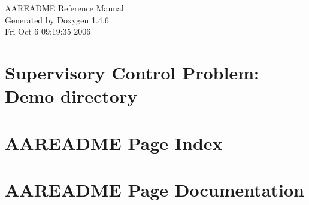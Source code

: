 \documentclass[a4paper]{book}
\begin{document}
\begin{titlepage}
\vspace*{7cm}
\begin{center}
{\Large AAREADME Reference Manual}\\
\vspace*{1cm}
{\large Generated by Doxygen 1.4.6}\\
\vspace*{0.5cm}
{\small Fri Oct 6 09:19:35 2006}\\
\end{center}
\end{titlepage}
\clearemptydoublepage
{}
\tableofcontents
\clearemptydoublepage
{}
\chapter{Supervisory Control Problem: Demo directory }
\label{index}
\chapter{AAREADME Page Index}

\chapter{AAREADME Page Documentation}

\printindex
\end{document}
